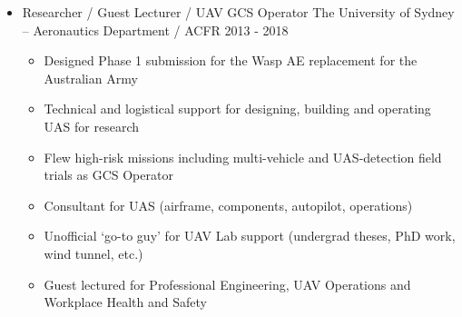 \documentclass[12pt,letter,sans]{moderncv}
\begin{document}
\begin{itemize}
\vspace{4pt}

\item{\cventry
    {}
    {Researcher / Guest Lecturer / UAV GCS Operator}
    {The University of Sydney – Aeronautics Department / ACFR}
    {2013 - 2018}
    {}
    {
        \vspace{3pt} 
        \begin{itemize}
            \item Designed Phase 1 submission for the Wasp AE replacement for the Australian Army
            \item Technical and logistical support for designing, building and operating UAS for research
            \item Flew high-risk missions including multi-vehicle and UAS-detection field trials as GCS Operator
            \item Consultant for UAS (airframe, components, autopilot, operations)
            \item Unofficial `go-to guy' for UAV Lab support (undergrad theses, PhD work, wind tunnel, etc.)
            \item Guest lectured for Professional Engineering, UAV Operations and Workplace Health and Safety
        \end{itemize}
        }
    }

%
\end{itemize}

\vspace{4pt}

\end{document}
